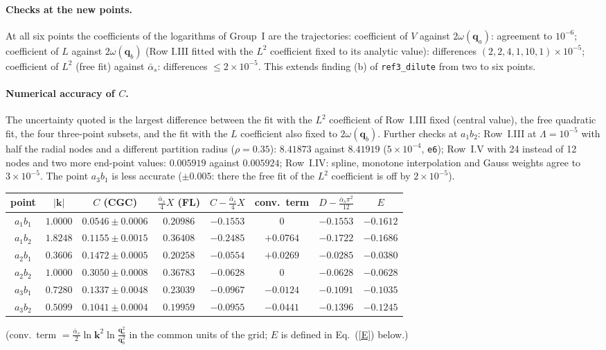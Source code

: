 \documentclass[11pt,a4paper]{article}
\renewcommand{\v}[1]{\bm{#1}}
\newcommand{\ab}{\bar\alpha_s}
\begin{document}
\paragraph{Checks at the new points.} At all six points the coefficients of the logarithms of Group~I are the trajectories: coefficient of $V$ against $2\omega(\v q_a)$: agreement to $10^{-6}$; coefficient of $L$ against $2\omega(\v q_b)$ (Row I.III fitted with the $L^2$ coefficient fixed to its analytic value): differences $(2,2,4,1,10,1)\times10^{-5}$; coefficient of $L^2$ (free fit) against $\ab$: differences $\le2\times10^{-5}$. This extends finding (b) of \texttt{ref3\_dilute} from two to six points.
\paragraph{Numerical accuracy of $C$.} The uncertainty quoted is the largest difference between the fit with the $L^2$ coefficient of Row~I.III fixed (central value), the free quadratic fit, the four three-point subsets, and the fit with the $L$ coefficient also fixed to $2\omega(\v q_b)$. Further checks at $a_1b_2$: Row~I.III at $\Lambda=10^{-5}$ with half the radial nodes and a different partition radius ($\rho=0.35$): $8.41873$ against $8.41919$ ($5\times10^{-4}$, \texttt{e6}); Row~I.V with 24 instead of 12 nodes and two more end-point values: $0.005919$ against $0.005924$; Row~I.IV: spline, monotone interpolation and Gauss weights agree to $3\times10^{-5}$. The point $a_3b_1$ is less accurate ($\pm0.005$: there the free fit of the $L^2$ coefficient is off by $2\times10^{-5}$).
\begin{center}
\renewcommand{\arraystretch}{1.15}
\begin{tabular}{|c|c|c|c|c|c|c|c|}\hline
point & $|\v k|$ & $C$ (CGC) & $\frac{\ab}{4}X$ (FL) & $C-\frac{\ab}4X$ & conv.\ term & $D-\frac{\ab\pi^2}{12}$ & $E$\\\hline
$a_1b_1$ & $1.0000$ & $0.0546\pm0.0006$ & $0.20986$ & $-0.1553$ & $0$ & $-0.1553$ & $-0.1612$\\
$a_1b_2$ & $1.8248$ & $0.1155\pm0.0015$ & $0.36408$ & $-0.2485$ & $+0.0764$ & $-0.1722$ & $-0.1686$\\
$a_2b_1$ & $0.3606$ & $0.1472\pm0.0005$ & $0.20258$ & $-0.0554$ & $+0.0269$ & $-0.0285$ & $-0.0380$\\
$a_2b_2$ & $1.0000$ & $0.3050\pm0.0008$ & $0.36783$ & $-0.0628$ & $0$ & $-0.0628$ & $-0.0628$\\
$a_3b_1$ & $0.7280$ & $0.1337\pm0.0048$ & $0.23039$ & $-0.0967$ & $-0.0124$ & $-0.1091$ & $-0.1035$\\
$a_3b_2$ & $0.5099$ & $0.1041\pm0.0004$ & $0.19959$ & $-0.0955$ & $-0.0441$ & $-0.1396$ & $-0.1245$\\\hline
\end{tabular}
\end{center}
(conv.\ term $=\frac{\ab}2\ln\v k^2\ln\frac{\v q_a^2}{\v q_b^2}$ in the common units of the grid; $E$ is defined in Eq.~(\ref{E}) below.)
\end{document}
